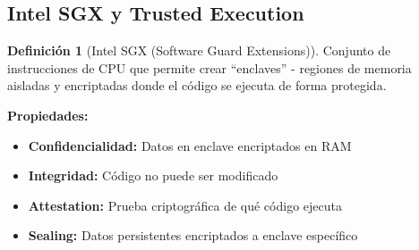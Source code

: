 \documentclass[11pt,a4paper,twoside]{book}
\theoremstyle{definition}
\newtheorem{definition}{Definición}[chapter]
\theoremstyle{remark}
\begin{document}
\subsection{Intel SGX y Trusted Execution}

\begin{definition}[Intel SGX (Software Guard Extensions)]
Conjunto de instrucciones de CPU que permite crear ``enclaves'' - regiones de memoria aisladas y encriptadas donde el código se ejecuta de forma protegida.

\textbf{Propiedades:}
\begin{itemize}
    \item \textbf{Confidencialidad:} Datos en enclave encriptados en RAM
    \item \textbf{Integridad:} Código no puede ser modificado
    \item \textbf{Attestation:} Prueba criptográfica de qué código ejecuta
    \item \textbf{Sealing:} Datos persistentes encriptados a enclave específico
\end{itemize}
\end{definition}
\end{document}
